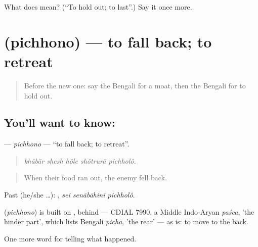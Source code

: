 \begin{tcolorbox}[breakable,colback=teal!4,colframe=teal!35!black,title={Before you move on}]
What does  mean? (\textquotedblleft{}To hold out; to last\textquotedblright{}.) Say it once more.
\end{tcolorbox}
\section[\texorpdfstring{\bn{পিছোনো} (pichhono)}{পিছোনো (pichhono)}]{ (pichhono) — to fall back; to retreat}

\label{lesson:BN-C316-pichhono}



\begin{quote}
Before the new one: say the Bengali for a moat, then the Bengali for to hold out.
\end{quote}

\subsection*{You'll want to know: }
\textbf{} — \emph{pichhono} — \textquotedblleft{}to fall back; to retreat\textquotedblright{}.

\begin{quote}
    
\end{quote}

\begin{quote}
\emph{khābār shesh hôle shôtrurā pichholô.}
\end{quote}

\begin{quote}
When their food ran out, the enemy fell back.
\end{quote}

Past (he/she …):   , \emph{sei senābāhinī pichholô}.

\begin{cousinweb}
\textbf{} (\emph{pichhono}) is built on , behind — CDIAL 7990, a Middle Indo-Aryan \emph{paśca}, 'the hinder part', which lists Bengali \emph{pichā}, 'the rear' — as \textbf{} is: to move to the back.
\end{cousinweb}

\begin{grammarlens}[title={What you've built}]
One more word for telling what happened.
\end{grammarlens}


